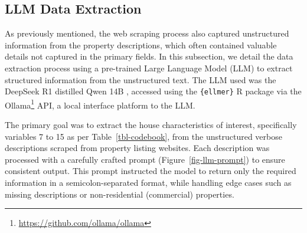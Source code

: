 \documentclass[
  number]{elsarticle}
\begin{document}
\subsection{LLM Data Extraction}\label{llm-data-extraction}

As previously mentioned, the web scraping process also captured
unstructured information from the property descriptions, which often
contained valuable details not captured in the primary fields. In this
subsection, we detail the data extraction process using a pre-trained
Large Language Model (LLM) to extract structured information from the
unstructured text. The LLM used was the DeepSeek R1 distilled Qwen 14B
\citep{deepseek2025deepseekr1, qwen2025qwen25}, accessed using the
\texttt{\{ellmer\}} R package \citep{wickham2025ellmer} via the
Ollama\footnote{\url{https://github.com/ollama/ollama}} API, a local
interface platform to the LLM.

The primary goal was to extract the house characteristics of interest,
specifically variables 7 to 15 as per Table~\ref{tbl-codebook}, from the
unstructured verbose descriptions scraped from property listing
websites. Each description was processed with a carefully crafted prompt
(Figure~\ref{fig-llm-prompt}) to ensure consistent output. This prompt
instructed the model to return only the required information in a
semicolon-separated format, while handling edge cases such as missing
descriptions or non-residential (commercial) properties.
\end{document}
